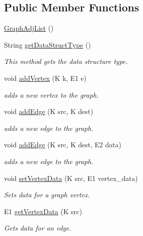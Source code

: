 \subsection*{Public Member Functions}
\begin{DoxyCompactItemize}
\item 
\hyperlink{classbridges_1_1base_1_1_graph_adj_list_aba7e066f43d361418ae6bdf53a23b1de}{Graph\+Adj\+List} ()
\item 
String \hyperlink{classbridges_1_1base_1_1_graph_adj_list_a40c4a2faf20c9847e8ba0d8024236a4b}{get\+Data\+Struct\+Type} ()
\begin{DoxyCompactList}\small\item\em This method gets the data structure type. \end{DoxyCompactList}\item 
void \hyperlink{classbridges_1_1base_1_1_graph_adj_list_aca59a3c40af4ae82716ebbfa1751f267}{add\+Vertex} (K k, E1 e)
\begin{DoxyCompactList}\small\item\em adds a new vertex to the graph. \end{DoxyCompactList}\item 
void \hyperlink{classbridges_1_1base_1_1_graph_adj_list_a43041976184920e1db1dbe3ad696c6cd}{add\+Edge} (K src, K dest)
\begin{DoxyCompactList}\small\item\em adds a new edge to the graph. \end{DoxyCompactList}\item 
void \hyperlink{classbridges_1_1base_1_1_graph_adj_list_aa9fa3cbb6a90de43ee6f0d59c8dce329}{add\+Edge} (K src, K dest, E2 data)
\begin{DoxyCompactList}\small\item\em adds a new edge to the graph. \end{DoxyCompactList}\item 
void \hyperlink{classbridges_1_1base_1_1_graph_adj_list_aa80bfbbe9c4dd130632db1e1165d635e}{set\+Vertex\+Data} (K src, E1 vertex\+\_\+data)
\begin{DoxyCompactList}\small\item\em Sets data for a graph vertex. \end{DoxyCompactList}\item 
E1 \hyperlink{classbridges_1_1base_1_1_graph_adj_list_a3d5f73795bcd5011c425eaca33383454}{get\+Vertex\+Data} (K src)
\begin{DoxyCompactList}\small\item\em Gets data for an edge. \end{DoxyCompactList}\item 

\end{DoxyCompactItemize}
